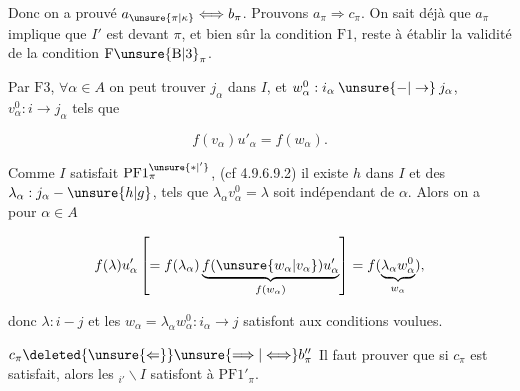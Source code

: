 Donc on a prouvé $a_{\unsure{\pi|\kappa}}\Longleftrightarrow b_\pi$. Prouvons $a_\pi\Longrightarrow c_\pi$. On sait déjà que $a_\pi$ implique que $I'$ est  devant $\pi$, et bien sûr la condition $\mathrm{F}1$, reste à établir la validité de la condition $\mathrm{F\unsure{B|3}}_\pi$.


Par $\mathrm{F}3$, $\forall\alpha\in A$ on peut trouver $j_\alpha$ dans $I$, et $w_\alpha^0:i_\alpha\mathbin{\unsure{-|\to}}j_\alpha$, $v_\alpha^0:i\to j_\alpha$ tels que

\[
f(v_\alpha)u'_\alpha=f(w_\alpha).
\]

Comme $I$ satisfait $\mathrm{PF}1^{\unsure{*|'}}_\pi$,  (cf 4.9.6.9.2) il existe  $h$ dans $I$ et des $\lambda_\alpha:j_\alpha\mathbin{-}\unsure{h|g}$, tels que $\lambda_\alpha v_\alpha^0=\lambda$ soit indépendant de $\alpha$. Alors  on a pour  $\alpha\in A$

\[
f(\lambda)u'_\alpha\left[=f(\lambda_\alpha)\underbrace{f(\unsure{w_\alpha|v_\alpha})u'_\alpha}_{f(w_\alpha)}\right]
=f(\underbrace{\lambda_\alpha w_\alpha^0}_{w_\alpha}),
\]

donc  $\lambda:i\mathbin{-}j$ et les  $w_\alpha=\lambda_\alpha w_\alpha^0:i_\alpha\longrightarrow j$ satisfont aux conditions voulues.

$c_\pi\deleted{\unsure{\Leftarrow}}\unsure{\Longrightarrow|\Longleftrightarrow}b_\pi''$ Il faut prouver que si $c_\pi$ est satisfait, alors les $ {}_{i'}\backslash I$ satisfont à $\mathrm{PF}1'_\pi$.

